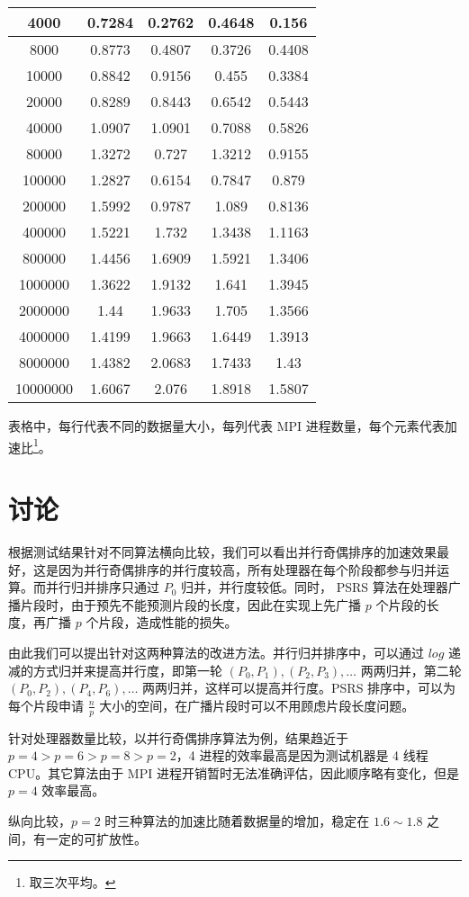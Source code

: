 \documentclass{zjureport-zh}
\begin{document}
\begin{table}[h]
{\begin{tabular}{|c|c|c|c|c|}
        \hline
        4000 & 0.7284 & 0.2762 & 0.4648 & 0.156 \\
        \hline
        8000 & 0.8773 & 0.4807 & 0.3726 & 0.4408 \\
        \hline
        10000 & 0.8842 & 0.9156 & 0.455 & 0.3384 \\
        \hline
        20000 & 0.8289 & 0.8443 & 0.6542 & 0.5443 \\
        \hline
        40000 & 1.0907 & 1.0901 & 0.7088 & 0.5826 \\
        \hline
        80000 & 1.3272 & 0.727 & 1.3212 & 0.9155 \\
        \hline
        100000 & 1.2827 & 0.6154 & 0.7847 & 0.879 \\
        \hline
        200000 & 1.5992 & 0.9787 & 1.089 & 0.8136 \\
        \hline
        400000 & 1.5221 & 1.732 & 1.3438 & 1.1163 \\
        \hline
        800000 & 1.4456 & 1.6909 & 1.5921 & 1.3406 \\
        \hline
        1000000 & 1.3622 & 1.9132 & 1.641 & 1.3945 \\
        \hline
        2000000 & 1.44 & 1.9633 & 1.705 & 1.3566 \\
        \hline
        4000000 & 1.4199 & 1.9663 & 1.6449 & 1.3913 \\
        \hline
        8000000 & 1.4382 & 2.0683 & 1.7433 & 1.43 \\
        \hline
        10000000 & 1.6067 & 2.076 & 1.8918 & 1.5807 \\
        \hline
	\end{tabular}
}
\end{table}

\par 表格中，每行代表不同的数据量大小，每列代表 MPI 进程数量，每个元素代表加速比\footnote{取三次平均。}。

\newpage
\section{讨论}
\par 根据测试结果针对不同算法横向比较，我们可以看出并行奇偶排序的加速效果最好，这是因为并行奇偶排序的并行度较高，所有处理器在每个阶段都参与归并运算。而并行归并排序只通过 $P_0$ 归并，并行度较低。同时， PSRS 算法在处理器广播片段时，由于预先不能预测片段的长度，因此在实现上先广播 $p$ 个片段的长度，再广播 $p$ 个片段，造成性能的损失。
\par 由此我们可以提出针对这两种算法的改进方法。并行归并排序中，可以通过 $log$ 递减的方式归并来提高并行度，即第一轮 $(P_0, P_1), (P_2, P_3), \dots$ 两两归并，第二轮 $(P_0, P_2), (P_4, P_6), \dots$ 两两归并，这样可以提高并行度。PSRS 排序中，可以为每个片段申请 $\frac{n}{p}$ 大小的空间，在广播片段时可以不用顾虑片段长度问题。

\par 针对处理器数量比较，以并行奇偶排序算法为例，结果趋近于 $p=4 > p=6 > p=8 > p=2$，4 进程的效率最高是因为测试机器是 4 线程 CPU。其它算法由于 MPI 进程开销暂时无法准确评估，因此顺序略有变化，但是 $p=4$ 效率最高。

\par 纵向比较，$p=2$ 时三种算法的加速比随着数据量的增加，稳定在 $1.6 \sim 1.8$ 之间，有一定的可扩放性。
\end{document}
